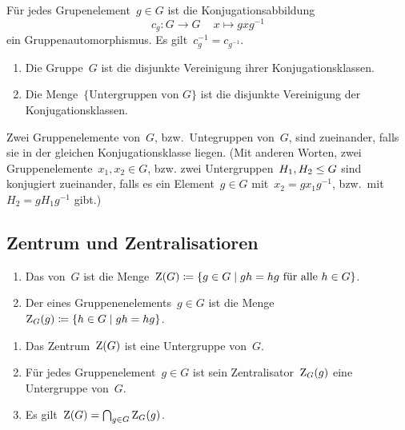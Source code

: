 \begin{proposition}
  Für jedes Grupenelement~$g \in G$ ist die Konjugationsabbildung
  \[
    c_g
    \colon
    G \to G \,
    \quad
    x \mapsto g x g^{-1}
  \]
  ein Gruppenautomorphismus.
  Es gilt~$c_g^{-1} = c_{g^{-1}}$.
\end{proposition}

\begin{proposition}
  \leavevmode
  \begin{enumerate}
    \item
      Die Gruppe~$G$ ist die disjunkte Vereinigung ihrer Konjugationsklassen.
    \item
      Die Menge~$\{ \text{Untergruppen von~$G$} \}$ ist die disjunkte Vereinigung der Konjugationsklassen.
  \end{enumerate}
\end{proposition}

\begin{definition}
  Zwei Gruppenelemente von~$G$, bzw.\ Untegruppen von~$G$, sind  zueinander, falls sie in der gleichen Konjugationsklasse liegen.
  (Mit anderen Worten, zwei Gruppenelemente~$x_1, x_2 \in G$, bzw. zwei Untergruppen~$H_1, H_2 \leq G$ sind konjugiert zueinander, falls es ein Element~$g \in G$ mit~$x_2 = g x_1 g^{-1}$, bzw.\ mit~$H_2 = g H_1 g^{-1}$ gibt.)
\end{definition}



\subsection{Zentrum und Zentralisatioren}

\begin{definition}
  \leavevmode
  \begin{enumerate}
    \item
      Das  von~$G$ ist die Menge~$\zenter(G) \defined \{ g \in G \suchthat \text{$g h = h g$ für alle~$h \in G$} \}$.
    \item
      Der  eines Gruppenenelements~$g \in G$ ist die Menge~$\zentralizer_G(g) \defined \{ h \in G \suchthat gh = hg \}$.
  \end{enumerate}
\end{definition}

\begin{proposition}
  \leavevmode
  \begin{enumerate}
    \item
      Das Zentrum~$\operatorname{Z}(G)$ ist eine Untergruppe von~$G$.
    \item
      Für jedes Gruppenelement~$g \in G$ ist sein Zentralisator~$\operatorname{Z}_G(g)$ eine Untergruppe von~$G$.
    \item
      Es gilt~$\operatorname{Z}(G) = \bigcap_{g \in G} \operatorname{Z}_G(g)$.
  \end{enumerate}
\end{proposition}




